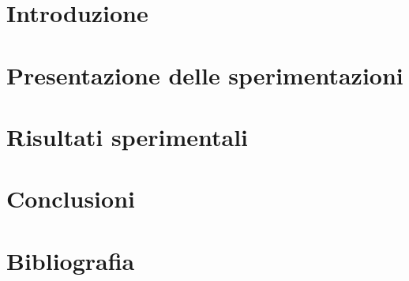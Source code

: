 \documentclass[a4paper,12pt,parskip=half]{book}
\begin{document}
\chapter{Introduzione} %
\label{chapter:primo} %

\clearpage{\pagestyle{plain}\cleardoublepage} %
\chapter{Presentazione delle sperimentazioni} %
\label{chapter:secondo} %

\clearpage{\pagestyle{plain}\cleardoublepage} %
\chapter{Risultati sperimentali} %
\label{chapter:terzo} %

\clearpage{\pagestyle{plain}\cleardoublepage} %
\chapter{Conclusioni} %
\label{chapter:quarto} %

\clearpage{\pagestyle{plain}\cleardoublepage} %
\chapter*{Bibliografia} %
\label{chapter:biblio} %
\printbibliography[heading=none]
\end{document}
